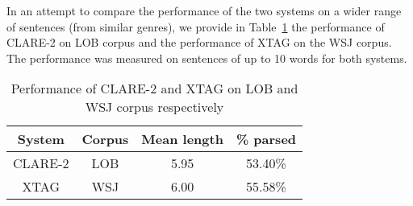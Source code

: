 In an attempt to compare the performance of the two systems on a wider
range of sentences (from similar genres), we provide in
Table~\ref{clare-results1} the performance of CLARE-2 on LOB corpus
and the performance of XTAG on the WSJ corpus. The performance was
measured on sentences of up to 10 words for both systems.
\begin{table}[ht]
\centering
\begin{tabular}{|c|c|c|c|}  \hline
System & Corpus & Mean length & \% parsed \\ \hline
CLARE-2 & LOB & 5.95 & 53.40\% \\ \hline
XTAG & WSJ & 6.00 & 55.58\% \\ \hline
\end{tabular}
\caption{Performance of CLARE-2 and XTAG on LOB and WSJ corpus
respectively}
\label{clare-results1}
\end{table}

